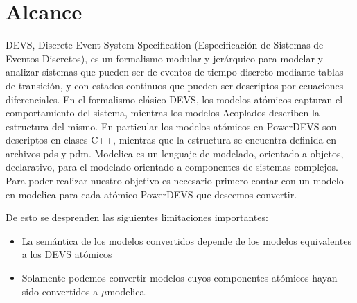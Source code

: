 \section{Alcance}
DEVS\cite{Zeigler:2000:TMS:580780}, Discrete Event System Specification (Especificación de Sistemas de Eventos Discretos), es un formalismo modular y jerárquico para modelar y analizar sistemas que pueden ser de eventos de tiempo discreto mediante tablas de transición, y con estados continuos que pueden ser descriptos por ecuaciones diferenciales.
En el formalismo clásico DEVS, los modelos atómicos capturan el comportamiento del sistema, mientras los modelos Acoplados describen la estructura del mismo.
En particular los modelos atómicos en PowerDEVS son descriptos en clases C++, mientras que la estructura se encuentra definida en archivos pds y pdm.
Modelica es un lenguaje de modelado, orientado a objetos, declarativo, para el modelado orientado a componentes de sistemas complejos.
Para poder realizar nuestro objetivo es necesario primero contar con un modelo en modelica\cite{Fritzson02modelica--} para cada atómico PowerDEVS\cite{BK11} que deseemos convertir. 

De esto se desprenden las siguientes limitaciones importantes:
\begin{itemize}
	\item La semántica de los modelos convertidos depende de los modelos equivalentes a los DEVS atómicos 
	\item Solamente podemos convertir modelos cuyos componentes atómicos hayan sido convertidos a $\mu$modelica.
\end{itemize}


